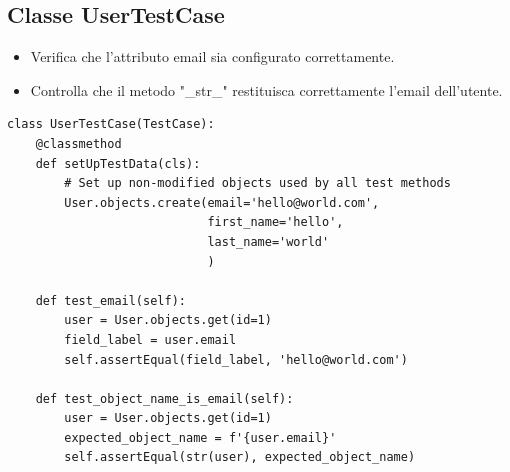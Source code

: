 \subsection{Classe UserTestCase}
\begin{itemize}
    \item Verifica che l'attributo email sia configurato correttamente.
    \item Controlla che il metodo "\_str\_" restituisca correttamente l'email dell'utente.
\end{itemize}
\begin{listing}[!ht]
\begin{verbatim}
class UserTestCase(TestCase):
    @classmethod
    def setUpTestData(cls):
        # Set up non-modified objects used by all test methods
        User.objects.create(email='hello@world.com',
                            first_name='hello',
                            last_name='world'
                            )

    def test_email(self):
        user = User.objects.get(id=1)
        field_label = user.email
        self.assertEqual(field_label, 'hello@world.com')

    def test_object_name_is_email(self):
        user = User.objects.get(id=1)
        expected_object_name = f'{user.email}'
        self.assertEqual(str(user), expected_object_name)
\end{verbatim}
\end{listing}
